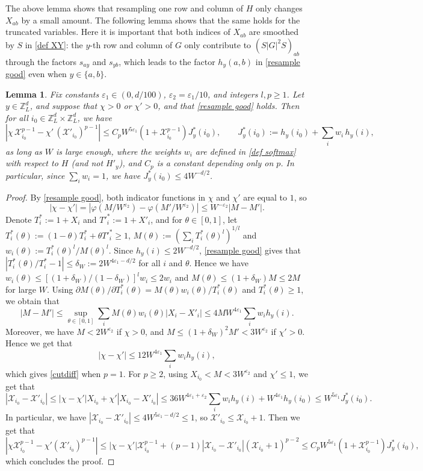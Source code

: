\documentclass{article}
\newcommand{\1}{\mathds{1}}
\numberwithin{equation}{section}
\newcommand{\be}{\begin{equation}}
\newcommand{\ee}{\end{equation}}
\newcommand{\e}{{\varepsilon}}
\renewcommand{\cal}{\mathcal}
\renewcommand{\leq}{\leqslant}
\renewcommand{\geq}{\geqslant}
\renewcommand{\le}{\leq}
\renewcommand{\ge}{\geq}
\newcommand{\Z}{\mathbb{Z}}
\theoremstyle{plain} %
\newtheorem{lemma}[theorem]{Lemma}
\theoremstyle{remark}
\begin{document}
The above lemma shows that resampling one row and column of $H$ only changes $X_{ab}$ by a small amount. The following lemma shows that the same holds for the truncated variables. Here it is important that both indices of $X_{ab}$ are smoothed by $S$ in \eqref{def XY}: the $y$-th row and column of $G$ only contribute to $(S|G|^2S)_{ab}$ through the factors $s_{ay}$ and $s_{yb}$, which leads to the factor $h_y(a,b)$ in \eqref{resample good} even when $y\in\{a,b\}$.

\begin{lemma}\label{lem cutdiff}
Fix constants $\e_1\in(0,d/100)$, $\e_2=\e_1/10$, and integers $l,p\ge 1$. Let $y\in\Z_L^d$, and suppose that $\chi>0$ or $\chi'>0$, and that \eqref{resample good} holds. Then for all $i_0\in\Z_L^d\times\Z_L^d$, we have
\be\label{cutdiff}
\left|\chi\,\cal X_{i_0}^{p-1}-\chi'\,(\cal X'_{i_0})^{p-1}\right|\le C_{p}W^{5\e_1}\left(1+\cal X_{i_0}^{p-1}\right)J_y^*(i_0),\qquad J_y^*(i_0):=h_y(i_0)+\sum_{i}w_{i}\,h_y(i),
\ee
as long as $W$ is large enough, where the weights $w_i$ are defined in \eqref{def softmax} with respect to $H$ (and not $H'_y$), and $C_p$ is a constant depending only on $p$. In particular, since $\sum_iw_i=1$, we have $J_y^*(i_0)\le 4W^{-d/2}$.
\end{lemma}
\begin{proof}
By \eqref{resample good}, both indicator functions in $\chi$ and $\chi'$ are equal to $1$, so
$$|\chi-\chi'|=\left|\varphi(M/W^{\e_2})-\varphi(M'/W^{\e_2})\right|\le W^{-\e_2}|M-M'|.$$
Denote $T^*_i:=1+X_i$ and $T'^*_i:=1+X'_i$, and for $\theta\in[0,1]$, let $T^*_i(\theta):=(1-\theta)T^*_i+\theta T'^*_i\ge 1$, $M(\theta):=(\sum_i T^*_i(\theta)^l)^{1/l}$ and $w_i(\theta):=T^*_i(\theta)^l/M(\theta)^l$. Since $h_y(i)\le 2W^{-d/2}$, \eqref{resample good} gives that $|T^*_i(\theta)/T^*_i-1|\le \delta_W:=2W^{4\e_1-d/2}$ for all $i$ and $\theta$. Hence we have $w_i(\theta)\le [(1+\delta_W)/(1-\delta_W)]^lw_i\le 2w_i$ and $M(\theta)\le (1+\delta_W)M\le 2M$ for large $W$. Using $\partial M(\theta)/\partial T^*_i(\theta)=M(\theta)w_i(\theta)/T^*_i(\theta)$ and $T^*_i(\theta)\ge 1$, we obtain that
$$|M-M'|\le \sup_{\theta\in[0,1]}\sum_iM(\theta)w_i(\theta)|X_i-X'_i|\le 4MW^{4\e_1}\sum_iw_ih_y(i).$$
Moreover, we have $M< 2W^{\e_2}$ if $\chi>0$, and $M\le (1+\delta_W)^2M'< 3W^{\e_2}$ if $\chi'>0$. Hence we get that
$$|\chi-\chi'|\le 12W^{4\e_1}\sum_iw_ih_y(i),$$
which gives \eqref{cutdiff} when $p=1$. For $p\ge2$, using $X_{i_0}<M< 3W^{\e_2}$ and $\chi'\le 1$, we get that
$$|\cal X_{i_0}-\cal X'_{i_0}|\le |\chi-\chi'|X_{i_0}+\chi'|X_{i_0}-X'_{i_0}|\le 36W^{4\e_1+\e_2}\sum_iw_ih_y(i)+W^{4\e_1}h_y(i_0)\le W^{5\e_1}J^*_y(i_0).$$
In particular, we have $|\cal X_{i_0}-\cal X'_{i_0}|\le 4W^{5\e_1-d/2}\le 1$, so $\cal X'_{i_0}\le \cal X_{i_0}+1$. Then we get that
$$\left|\chi\cal X_{i_0}^{p-1}-\chi'(\cal X'_{i_0})^{p-1}\right|\le |\chi-\chi'|\cal X_{i_0}^{p-1}+(p-1)|\cal X_{i_0}-\cal X'_{i_0}|(\cal X_{i_0}+1)^{p-2}\le C_pW^{5\e_1}(1+\cal X^{p-1}_{i_0})J^*_y(i_0),$$
which concludes the proof.
\end{proof}
\end{document}
